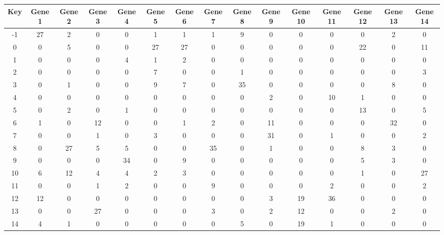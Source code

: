\begin{tabular}{|c|c|c|c|c|c|c|c|c|c|c|c|c|c|c|}
\hline
Key & Gene 1 & Gene 2 & Gene 3 & Gene 4 & Gene 5 & Gene 6 & Gene 7 & Gene 8 & Gene 9 & Gene 10 & Gene 11 & Gene 12 & Gene 13 & Gene 14 \\
\hline
-1 & 27 & 2 & 0 & 0 & 1 & 1 & 1 & 9 & 0 & 0 & 0 & 0 & 2 & 0 \\
0 & 0 & 5 & 0 & 0 & 27 & 27 & 0 & 0 & 0 & 0 & 0 & 22 & 0 & 11 \\
1 & 0 & 0 & 0 & 4 & 1 & 2 & 0 & 0 & 0 & 0 & 0 & 0 & 0 & 0 \\
2 & 0 & 0 & 0 & 0 & 7 & 0 & 0 & 1 & 0 & 0 & 0 & 0 & 0 & 3 \\
3 & 0 & 1 & 0 & 0 & 9 & 7 & 0 & 35 & 0 & 0 & 0 & 0 & 8 & 0 \\
4 & 0 & 0 & 0 & 0 & 0 & 0 & 0 & 0 & 2 & 0 & 10 & 1 & 0 & 0 \\
5 & 0 & 2 & 0 & 1 & 0 & 0 & 0 & 0 & 0 & 0 & 0 & 13 & 0 & 5 \\
6 & 1 & 0 & 12 & 0 & 0 & 1 & 2 & 0 & 11 & 0 & 0 & 0 & 32 & 0 \\
7 & 0 & 0 & 1 & 0 & 3 & 0 & 0 & 0 & 31 & 0 & 1 & 0 & 0 & 2 \\
8 & 0 & 27 & 5 & 5 & 0 & 0 & 35 & 0 & 1 & 0 & 0 & 8 & 3 & 0 \\
9 & 0 & 0 & 0 & 34 & 0 & 9 & 0 & 0 & 0 & 0 & 0 & 5 & 3 & 0 \\
10 & 6 & 12 & 4 & 4 & 2 & 3 & 0 & 0 & 0 & 0 & 0 & 1 & 0 & 27 \\
11 & 0 & 0 & 1 & 2 & 0 & 0 & 9 & 0 & 0 & 0 & 2 & 0 & 0 & 2 \\
12 & 12 & 0 & 0 & 0 & 0 & 0 & 0 & 0 & 3 & 19 & 36 & 0 & 0 & 0 \\
13 & 0 & 0 & 27 & 0 & 0 & 0 & 3 & 0 & 2 & 12 & 0 & 0 & 2 & 0 \\
14 & 4 & 1 & 0 & 0 & 0 & 0 & 0 & 5 & 0 & 19 & 1 & 0 & 0 & 0 \\
\hline
\end{tabular}